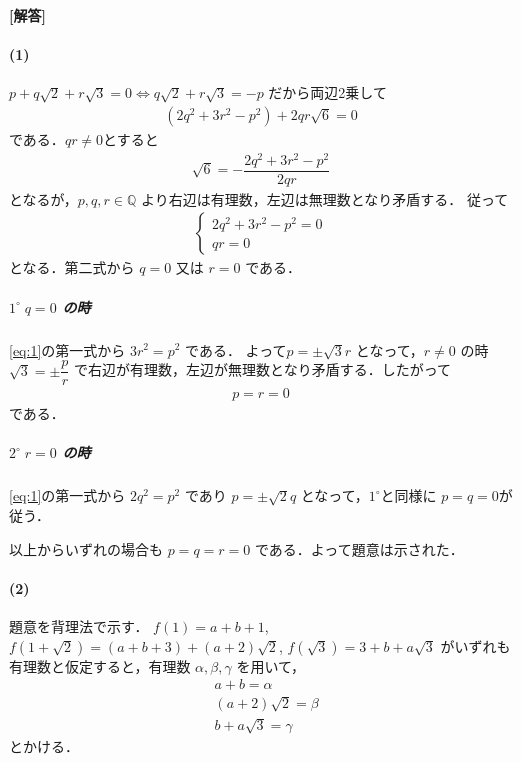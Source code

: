 \documentclass[../../main.tex]{subfiles}
\begin{document}
\begin{oframed}
  
\end{oframed}

{\bf [解答]}

\paragraph{(1)}

$p + q\sqrt{2} + r\sqrt{3} = 0 \iff q\sqrt{2} + r\sqrt{3} = -p$ だから両辺2乗して
\begin{align}
  (2q^2 + 3r^2 - p^2) + 2qr\sqrt{6} = 0
\end{align}
である．$qr \neq 0$とすると
\begin{align}
  \sqrt{6} = -\dfrac{2q^2 + 3r^2 - p^2}{2qr}
\end{align}
となるが，$p, q, r \in \mathbb{Q}$ より右辺は有理数，左辺は無理数となり矛盾する．
従って
\begin{align}
  \begin{cases}
    2q^2 + 3r^2 - p^2 = 0  \\
    qr = 0
  \end{cases} \label{eq:1}
\end{align}
となる．第二式から $q=0$ 又は $r=0$ である．

\subparagraph{$1^\circ \; q=0$ の時}

\cref{eq:1}の第一式から $3r^2 = p^2$ である．
よって$p = \pm \sqrt{3} r$ となって，$r \ne 0$ の時 $\sqrt{3} = \pm\dfrac{p}{r}$ で右辺が有理数，左辺が無理数となり矛盾する．したがって
\begin{align}
  p = r = 0
\end{align}
である．

\subparagraph{$2^\circ \; r=0$ の時}

\cref{eq:1}の第一式から $2q^2 = p^2$ であり $p = \pm \sqrt{2} q$ となって，$1^{\circ}$と同様に $p = q = 0$が従う．
\casesend

以上からいずれの場合も $p = q = r = 0$ である．よって題意は示された．

\paragraph{(2)}

題意を背理法で示す．
$f(1) = a+b+1$, $f(1+\sqrt{2}) = (a+b+3) + (a+2)\sqrt{2}$, $f(\sqrt{3}) = 3+b + a\sqrt{3}$ がいずれも有理数と仮定すると，有理数 $\alpha, \beta, \gamma$ を用いて，
\begin{align}
  & a+b = \alpha  \label{eq:2}\\
  & (a+2)\sqrt{2} = \beta \label{eq:3} \\
  & b+a\sqrt{3} = \gamma \label{eq:4}
\end{align}
とかける．
\end{document}
